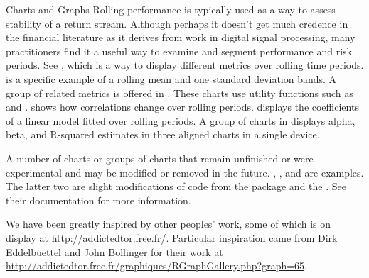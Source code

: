 \documentclass[12pt,letterpaper,english]{article}
\begin{document}
\begin{Section}{Charts and Graphs}
Rolling performance is typically used as a way to assess stability of a return stream.  Although perhaps it doesn't get much credence in the financial literature as it derives from work in digital signal processing, many practitioners find it a useful way to examine and segment performance and risk periods.  See , which is a way to display different metrics over rolling time periods.   is a specific example of a rolling mean and one standard deviation bands.  A group of related metrics is offered in .  These charts use utility functions such as  and .   shows how correlations change over rolling periods.   displays the coefficients of a linear model fitted over rolling periods.  A group of charts in  displays alpha, beta, and R-squared estimates in three aligned charts in a single device.

A number of charts or groups of charts that remain unfinished or were experimental and may be modified or removed in the future.  , , and  are examples.  The latter two are slight modifications of code from the package  and the \R{} .  See their documentation for more information.

We have been greatly inspired by other peoples' work, some of which is on display at \url{http://addictedtor.free.fr/}.  Particular inspiration came from Dirk Eddelbuettel and John Bollinger for their work at \url{http://addictedtor.free.fr/graphiques/RGraphGallery.php?graph=65}.
\end{Section}
\end{document}
